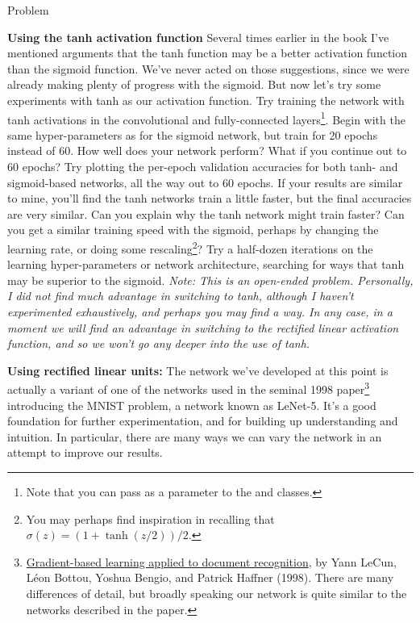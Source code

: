 \documentclass[a4paper,twoside,10pt]{book}
\begin{document}
\begin{exercize}{Problem}
	\item \textbf{Using the tanh activation function} Several times earlier in the book I've mentioned arguments that the tanh function may be a better activation function than the sigmoid function. We've never acted on those suggestions, since we were already making plenty of progress with the sigmoid. But now let's try some experiments with tanh as our activation function. Try training the network with tanh activations in the convolutional and fully-connected layers\footnote{Note that you can pass  as a parameter to the  and  classes.}. Begin with the same hyper-parameters as for the sigmoid network, but train for 20 epochs instead of 60. How well does your network perform? What if you continue out to 60 epochs? Try plotting the per-epoch validation accuracies for both tanh- and sigmoid-based networks, all the way out to 60 epochs. If your results are similar to mine, you'll find the tanh networks train a little faster, but the final accuracies are very similar. Can you explain why the tanh network might train faster? Can you get a similar training speed with the sigmoid, perhaps by changing the learning rate, or doing some rescaling\footnote{You may perhaps find inspiration in recalling that $\sigma(z) = (1+\tanh(z/2))/2$.}? Try a half-dozen iterations on the learning hyper-parameters or network architecture, searching for ways that tanh may be superior to the sigmoid. \textit{Note: This is an open-ended problem. Personally, I did not find much advantage in switching to tanh, although I haven't experimented exhaustively, and perhaps you may find a way. In any case, in a moment we will find an advantage in switching to the rectified linear activation function, and so we won't go any deeper into the use of tanh.}
\end{exercize}
\textbf{Using rectified linear units:} The network we've developed at this point is actually a variant of one of the networks used in the seminal 1998 paper\footnote{\href{http://yann.lecun.com/exdb/publis/pdf/lecun-98.pdf}{Gradient-based learning applied to document recognition}, by Yann LeCun, L\'eon Bottou, Yoshua Bengio, and Patrick Haffner (1998). There are many differences of detail, but broadly speaking our network is quite similar to the networks described in the paper.} introducing the MNIST problem, a network known as LeNet-5. It's a good foundation for further experimentation, and for building up understanding and intuition. In particular, there are many ways we can vary the network in an attempt to improve our results.
\end{document}
